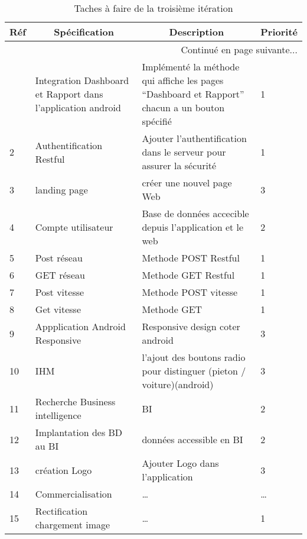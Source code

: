 \begin{center}
    \footnotesize
    \begin{longtable}{| p{1cm} | p{5cm} | p{7cm} | p{1cm} |}
        \caption{Taches à faire de la troisième itération}
        \label{tab:sprint3-backlog} \\

 \hline
 \multicolumn{1}{|c}{\textbf{Réf}} &
 \multicolumn{1}{|c}{\textbf{Spécification}} &
 \multicolumn{1}{|c}{\textbf{Description}} &
 \multicolumn{1}{|c|}{\textbf{Priorité}} \\ \hline
 \endhead

 \hline \multicolumn{4}{|r|}{{Continué en page suivante$\dotsc$}} \\ \hline
 \endfoot

 \hline \hline
 \endlastfoot

\hline
1 & Integration Dashboard et Rapport dans l'application android & Implémenté la méthode qui affiche les pages ``Dashboard et Rapport'' chacun a un bouton spécifié   & 1 \\ \hline
2 & Authentification Restful  & Ajouter l'authentification dans le serveur pour assurer la sécurité   & 1 \\ \hline
3 & landing page & créer une nouvel page Web  & 3\\ \hline
4 & Compte utilisateur & Base de données accecible depuis l'application et le web& 2 \\ \hline
5 & Post réseau & Methode POST Restful & 1 \\ \hline
6 & GET réseau & Methode GET Restful & 1 \\ \hline
7 & Post vitesse & Methode POST vitesse & 1 \\ \hline
8 & Get vitesse & Methode GET & 1 \\ \hline
9 & Appplication Android Responsive & Responsive design coter android & 3 \\ \hline
10 & IHM & l'ajout des boutons radio pour distinguer (pieton / voiture)(android) & 3 \\ \hline
11 & Recherche Business intelligence & BI & 2 \\ \hline
12 & Implantation des BD au BI & données accessible en BI & 2\\ \hline
13 & création Logo &Ajouter Logo dans l'application & 3 \\ \hline
14 & Commercialisation & \ldots & \ldots \\ \hline
15 & Rectification chargement image & \ldots & 1 \\ \hline



\end{longtable}
\end{center}

